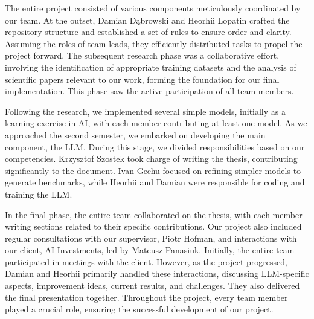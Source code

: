 The entire project consisted of various components meticulously coordinated by our team. At the outset, Damian Dąbrowski and Heorhii Lopatin crafted the repository structure and established a set of rules to ensure order and clarity. Assuming the roles of team leads, they efficiently distributed tasks to propel the project forward. The subsequent research phase was a collaborative effort, involving the identification of appropriate training datasets and the analysis of scientific papers relevant to our work, forming the foundation for our final implementation. This phase saw the active participation of all team members.

Following the research, we implemented several simple models, initially as a learning exercise in AI, with each member contributing at least one model. As we approached the second semester, we embarked on developing the main component, the LLM. During this stage, we divided responsibilities based on our competencies. Krzysztof Szostek took charge of writing the thesis, contributing significantly to the document. Ivan Gechu focused on refining simpler models to generate benchmarks, while Heorhii and Damian were responsible for coding and training the LLM.

In the final phase, the entire team collaborated on the thesis, with each member writing sections related to their specific contributions. Our project also included regular consultations with our supervisor, Piotr Hofman, and interactions with our client, AI Investments, led by Mateusz Panasiuk. Initially, the entire team participated in meetings with the client. However, as the project progressed, Damian and Heorhii primarily handled these interactions, discussing LLM-specific aspects, improvement ideas, current results, and challenges. They also delivered the final presentation together. Throughout the project, every team member played a crucial role, ensuring the successful development of our project.

